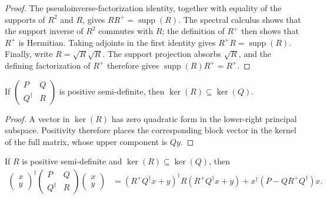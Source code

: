 \begin{proof}\leanok
  The pseudoinverse-factorization identity, together with equality of the
  supports of $R^2$ and $R$, gives $RR^+=\operatorname{supp}(R)$.
  The spectral calculus shows that the support inverse of $R^2$ commutes with
  $R$; the definition of $R^+$ then shows that $R^+$ is Hermitian. Taking
  adjoints in the first identity gives
  $R^+R=\operatorname{supp}(R)$. Finally, write $R=\sqrt R\sqrt R$.
  The support projection absorbs $\sqrt R$, and the defining factorization of
  $R^+$ therefore gives $\operatorname{supp}(R)R^+=R^+$.
\end{proof}

\begin{theorem}
  \label{thm:block_psd_kernel_inclusion}
  \leanok
  If $\begin{pmatrix}P&Q\\Q^\dagger&R\end{pmatrix}$ is positive
  semi-definite, then $\ker(R)\subseteq\ker(Q)$.
\end{theorem}

\begin{proof}\leanok
  A vector in $\ker(R)$ has zero quadratic form in the lower-right principal
  subspace. Positivity therefore places the corresponding block vector in
  the kernel of the full matrix, whose upper component is $Qy$.
\end{proof}

\begin{theorem}
  \label{thm:schur_complement_quadratic_form}
  \leanok
  If $R$ is positive semi-definite and
  $\ker(R)\subseteq\ker(Q)$, then
  \begin{align}
    \begin{pmatrix}x\\y\end{pmatrix}^{\!\dagger}
      \begin{pmatrix}P&Q\\Q^\dagger&R\end{pmatrix}
      \begin{pmatrix}x\\y\end{pmatrix}
    &=(R^+Q^\dagger x+y)^\dagger R(R^+Q^\dagger x+y)
      +x^\dagger(P-QR^+Q^\dagger)x.
  \end{align}
\end{theorem}

